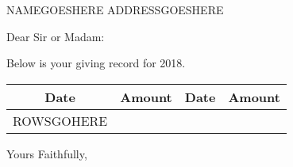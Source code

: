 \documentclass{letter}
\begin{document}
\begin{letter}{NAMEGOESHERE ADDRESSGOESHERE}
\opening{Dear Sir or Madam:}
Below is your giving record for 2018.

\begin{center}
  \begin{tabular}{|cr|cr|}
    \hline
    Date & Amount & Date & Amount \\
    \hline
    ROWSGOHERE
    \hline
  \end{tabular}
\end{center}

\closing{Yours Faithfully,}
\end{letter}
\end{document}
